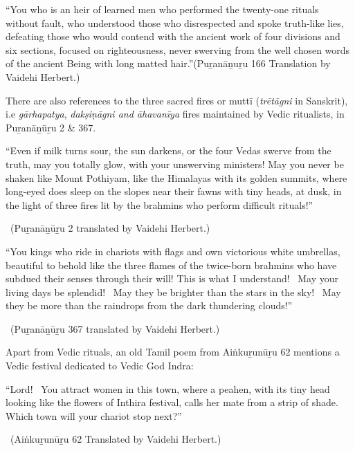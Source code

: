 \begin{myquote}
“You who is an heir of learned men who performed the twenty-one rituals without fault, who understood those who disrespected and spoke truth-like lies, defeating those who would contend with the ancient work of four divisions and six sections, focused on righteousness, never swerving from the well chosen words of the ancient Being with long matted hair.”\hfill (Puṟanāṉuṟu 166 Translation by Vaidehi Herbert.)
\end{myquote}

There are also references to the three sacred fires or muttī (\textit{trētāgni} in Sanskrit), i.e \textit{gārhapatya}, \textit{dakṣiṇāgni and āhavanīya} fires maintained by Vedic ritualists, in Puṟanāṉūṟu 2 \& 367.

\begin{myquote}
“Even if milk turns sour, the sun darkens, or the four Vedas swerve from the truth, may you totally glow, with your unswerving ministers! May you never be shaken like Mount Pothiyam, like the Himalayas with its golden summits, where long-eyed does sleep on the slopes near their fawns with tiny heads, at dusk, in the light of three fires lit by the brahmins who perform difficult rituals!”

~\hfill (Puṟanāṉūṟu 2 translated by Vaidehi Herbert.)
\end{myquote}

\begin{myquote}
“You kings who ride in chariots with flags and own victorious white umbrellas, beautiful to behold like the three flames of the twice-born brahmins who have subdued their senses through their will! This is what I understand!  May your living days be splendid!  May they be brighter than the stars in the sky!  May they be more than the raindrops from the dark thundering clouds!”

~\hfill (Puṟanāṉūṟu 367 translated by Vaidehi Herbert.)
\end{myquote}

Apart from Vedic rituals, an old Tamil poem from Aiṅkuṟunūṟu 62 mentions a Vedic festival dedicated to Vedic God Indra:

\begin{myquote}
“Lord!  You attract women in this town, where a peahen, with its tiny head looking like the flowers of Inthira festival, calls her mate from a strip of shade. Which town will your chariot stop next?”

~\hfill (Aiṅkuṟunūṟu 62 Translated by Vaidehi Herbert.)
\end{myquote}


